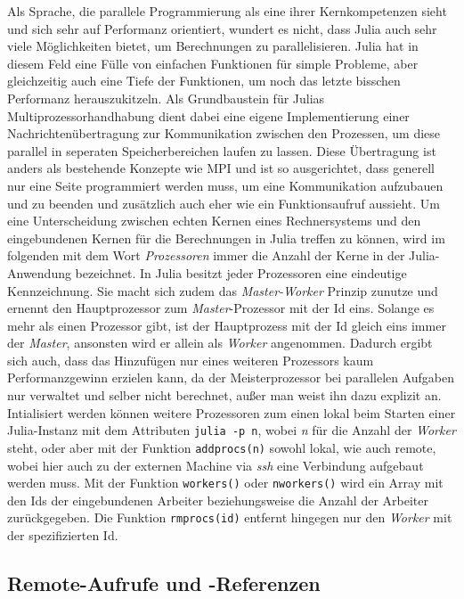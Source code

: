 \documentclass[proseminar,german,utf8]{zihpub}
\begin{document}
Als Sprache, die parallele Programmierung als eine ihrer Kernkompetenzen sieht und sich sehr auf Performanz orientiert, wundert es nicht, dass Julia auch sehr viele Möglichkeiten bietet, um Berechnungen zu parallelisieren. Julia hat in diesem Feld eine Fülle von einfachen Funktionen für simple Probleme, aber gleichzeitig auch eine Tiefe der Funktionen, um noch das letzte bisschen Performanz herauszukitzeln. Als Grundbaustein für Julias Multiprozessorhandhabung dient dabei eine eigene Implementierung einer Nachrichtenübertragung zur Kommunikation zwischen den Prozessen, um diese parallel in seperaten Speicherbereichen laufen zu lassen. Diese Übertragung ist anders als bestehende Konzepte wie MPI und ist so ausgerichtet, dass generell nur eine Seite programmiert werden muss, um eine Kommunikation aufzubauen und zu beenden und zusätzlich auch eher wie ein Funktionsaufruf aussieht. Um eine Unterscheidung zwischen echten Kernen eines Rechnersystems und den eingebundenen Kernen für die Berechnungen in Julia treffen zu können, wird im folgenden mit dem Wort \textit{Prozessoren} immer die Anzahl der Kerne in der Julia-Anwendung bezeichnet. In Julia besitzt jeder Prozessoren eine eindeutige Kennzeichnung. Sie macht sich zudem das \textit{Master-Worker} Prinzip zunutze und ernennt den Hauptprozessor zum \textit{Master}-Prozessor mit der Id eins. Solange es mehr als einen Prozessor gibt, ist der Hauptprozess mit der Id gleich eins immer der \textit{Master}, ansonsten wird er allein als \textit{Worker} angenommen. Dadurch ergibt sich auch, dass das Hinzufügen nur eines weiteren Prozessors kaum Performanzgewinn erzielen kann, da der Meisterprozessor bei parallelen Aufgaben nur verwaltet und selber nicht berechnet, außer man weist ihn dazu explizit an. Intialisiert werden können weitere Prozessoren zum einen lokal beim Starten einer Julia-Instanz mit dem Attributen \verb|julia -p n|, wobei \textit{n} für die Anzahl der \textit{Worker} steht, oder aber mit der Funktion \verb|addprocs(n)| sowohl lokal, wie auch remote, wobei hier auch zu der externen Machine via \textit{ssh} eine Verbindung aufgebaut werden muss. Mit der Funktion \verb|workers()| oder \verb|nworkers()| wird ein Array mit den Ids der eingebundenen Arbeiter beziehungsweise die Anzahl der Arbeiter zurückgegeben. Die Funktion \verb|rmprocs(id)| entfernt hingegen nur den \textit{Worker} mit der spezifizierten Id.~\cite{JuliaLangDocumentation}~\cite{JuliaCookbook}

\subsection{Remote-Aufrufe und -Referenzen}
\end{document}
